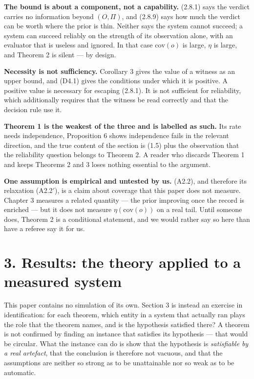 \documentclass[11pt,a4paper]{article}
\begin{document}
\textbf{The bound is about a component, not a capability.} (2.8.1) says the verdict
carries no information beyond \((O,\Pi)\), and (2.8.9) says how much the verdict can
be worth where the prior is thin. Neither says the system cannot succeed; a system
can succeed reliably on the strength of its observation alone, with an evaluator
that is useless and ignored. In that case \(\mathrm{cov}(o)\) is large, \(\eta\) is
large, and Theorem 2 is silent --- by design.

\textbf{Necessity is not sufficiency.} Corollary 3 gives the value of a witness as an
upper bound, and (D4.1) gives the conditions under which it is positive. A
positive value is necessary for escaping (2.8.1). It is not sufficient for
reliability, which additionally requires that the witness be read correctly and
that the decision rule use it.

\textbf{Theorem 1 is the weakest of the three and is labelled as such.} Its rate needs
independence, Proposition 6 shows independence fails in the relevant direction,
and the true content of the section is (1.5) plus the observation that the
reliability question belongs to Theorem 2. A reader who discards Theorem 1 and
keeps Theorems 2 and 3 loses nothing essential to the argument.

\textbf{One assumption is empirical and untested by us.} (A2.2), and therefore its
relaxation (A2.2\('\)), is a claim about coverage that this paper does not measure.
Chapter 3 measures a related quantity --- the prior improving once the record is
enriched --- but it does not measure \(\eta(\mathrm{cov}(o))\) on a real tail. Until
someone does, Theorem 2 is a conditional statement, and we would rather say so here
than have a referee say it for us.

\section{3. Results: the theory applied to a measured system}\label{results-the-theory-applied-to-a-measured-system}

This paper contains no simulation of its own. Section 3 is instead an exercise in
identification: for each theorem, which entity in a system that actually ran plays
the role that the theorem names, and is the hypothesis satisfied there? A theorem
is not confirmed by finding an instance that satisfies its hypothesis --- that would
be circular. What the instance can do is show that the hypothesis is \emph{satisfiable
by a real artefact}, that the conclusion is therefore not vacuous, and that the
assumptions are neither so strong as to be unattainable nor so weak as to be
automatic.
\end{document}
